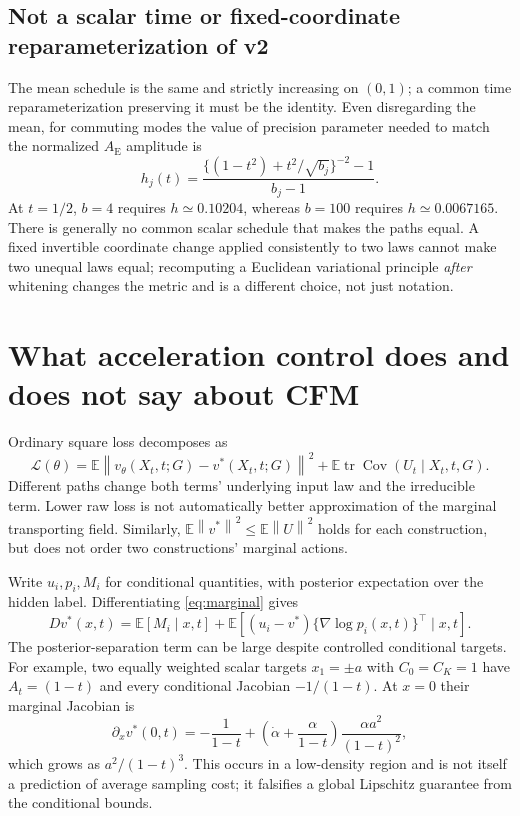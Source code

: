 \documentclass[11pt,letterpaper]{article}
\newcommand{\E}{\mathbb E}
\newcommand{\Cov}{\operatorname{Cov}}
\newcommand{\tr}{\operatorname{tr}}
\newcommand{\norm}[1]{\left\lVert#1\right\rVert}
\newcommand{\AltE}{A_{\mathrm E}}
\begin{document}
\subsection{Not a scalar time or fixed-coordinate reparameterization of v2}
The mean schedule is the same and strictly increasing on $(0,1)$; a common time reparameterization preserving it must be the identity. Even disregarding the mean, for commuting modes the value of precision parameter needed to match the normalized $\AltE$ amplitude is
\begin{equation}
h_j(t)=\frac{\{(1-t^2)+t^2/\sqrt{b_j}\}^{-2}-1}{b_j-1}.
\end{equation}
At $t=1/2$, $b=4$ requires $h\simeq0.10204$, whereas $b=100$ requires $h\simeq0.0067165$. There is generally no common scalar schedule that makes the paths equal. A fixed invertible coordinate change applied consistently to two laws cannot make two unequal laws equal; recomputing a Euclidean variational principle \emph{after} whitening changes the metric and is a different choice, not just notation.

\section{What acceleration control does and does not say about CFM}
\label{sec:learning}

Ordinary square loss decomposes as
\begin{equation}
\mathcal L(\theta)=\E\norm{v_\theta(X_t,t;G)-v^*(X_t,t;G)}^2
+\E\tr\Cov(U_t\mid X_t,t,G).
\label{eq:loss-decomposition}
\end{equation}
Different paths change both terms' underlying input law and the irreducible term. Lower raw loss is not automatically better approximation of the marginal transporting field. Similarly,
$\E\norm{v^*}^2\leq\E\norm{U}^2$ holds for each construction, but does not order two constructions' marginal actions.

Write $u_i,p_i,M_i$ for conditional quantities, with posterior expectation over the hidden label. Differentiating \eqref{eq:marginal} gives
\begin{equation}
Dv^*(x,t)=\E[M_i\mid x,t]
+\E[(u_i-v^*)\{\nabla\log p_i(x,t)\}^\top\mid x,t].
\label{eq:marginal-jac}
\end{equation}
The posterior-separation term can be large despite controlled conditional targets. For example, two equally weighted scalar targets $x_1=\pm a$ with $C_0=C_K=1$ have $A_t=(1-t)$ and every conditional Jacobian $-1/(1-t)$. At $x=0$ their marginal Jacobian is
\begin{equation}
\partial_xv^*(0,t)
=-\frac1{1-t}+\left(\dot\alpha+\frac\alpha{1-t}\right)
\frac{\alpha a^2}{(1-t)^2},
\label{eq:mixture-counter}
\end{equation}
which grows as $a^2/(1-t)^3$. This occurs in a low-density region and is not itself a prediction of average sampling cost; it falsifies a global Lipschitz guarantee from the conditional bounds.
\end{document}
